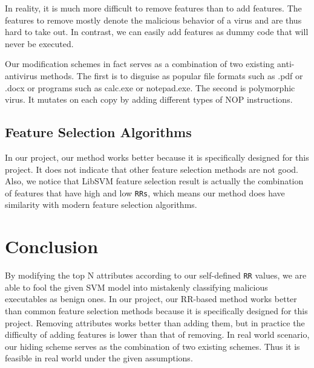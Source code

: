 \documentclass[11pt]{article}
\begin{document}
In reality, it is much more difficult to remove features than to add features. The features to remove mostly denote the malicious behavior of a virus and are thus hard to take out. In contrast, we can easily add features as dummy code that will never be executed.

Our modification schemes in fact serves as a combination of two existing anti-antivirus methods. The first is to disguise as popular file formats such as .pdf or .docx or programs such as calc.exe or notepad.exe. The second is polymorphic virus. It mutates on each copy by adding different types of NOP instructions.

\subsection{Feature Selection Algorithms}
In our project, our method works better because it is specifically designed for this project. It does not indicate that other feature selection methods are not good. Also, we notice that LibSVM feature selection result is actually the combination of features that have high and low \texttt{RRs}, which means our method does have similarity with modern feature selection algorithms.

\section{Conclusion}
By modifying the top N attributes according to our self-defined \texttt{RR} values, we are able to fool the given SVM model into mistakenly classifying malicious executables as benign ones. In our project, our RR-based method works better than common feature selection methods because it is specifically designed for this project. Removing attributes works better than adding them, but in practice the difficulty of adding features is lower than that of removing. In real world scenario, our hiding scheme serves as the combination of two existing schemes. Thus it is feasible in real world under the given assumptions.



\end{document}

